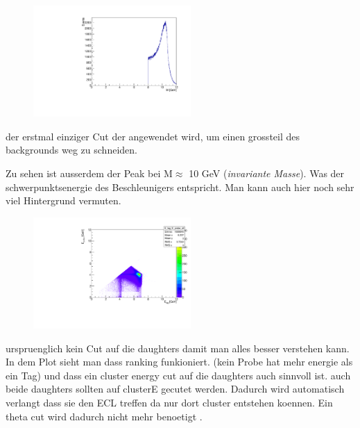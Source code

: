 \documentclass[10pt]{beamer}
\begin{document}
{\begin{frame}
\end{frame}




\begin{frame}
	\begin{figure}
		\includegraphics[width=6cm]{Collection/MCM8}
	\end{figure}

der erstmal einziger Cut der angewendet wird, um einen grossteil des backgrounds weg zu schneiden.

Zu sehen ist ausserdem der Peak bei M$\approx$ 10 GeV (\textit{invariante Masse}). Was der schwerpunktsenergie  des Beschleunigers entspricht. Man kann auch hier noch sehr viel Hintergrund vermuten.




\end{frame}





\begin{frame}
	\begin{figure} 
	\includegraphics[width=6cm]{Collection/MCEE8_all}
\end{figure}

urspruenglich kein Cut auf die daughters damit man alles besser verstehen kann. In dem Plot sieht man dass ranking funkioniert. (kein Probe hat mehr energie als ein Tag) und dass ein cluster energy cut auf die daughters auch sinnvoll ist. auch beide daughters sollten auf clusterE gecutet werden. Dadurch wird automatisch verlangt dass sie den ECL treffen da nur dort cluster entstehen koennen. Ein theta cut wird dadurch nicht mehr benoetigt
. 



\end{frame}}
\end{document}

